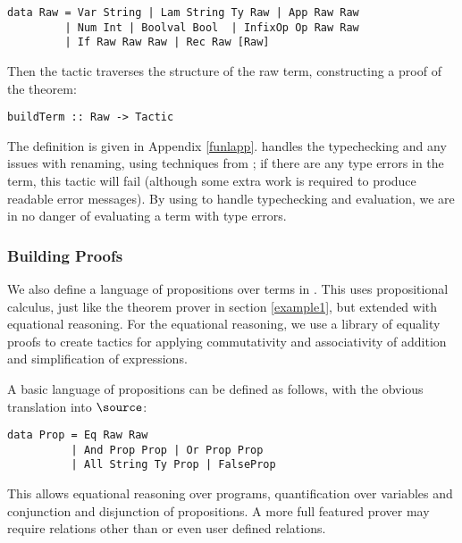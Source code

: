 \begin{verbatim}
data Raw = Var String | Lam String Ty Raw | App Raw Raw
         | Num Int | Boolval Bool  | InfixOp Op Raw Raw
         | If Raw Raw Raw | Rec Raw [Raw]
\end{verbatim}

Then the  tactic traverses the
structure of the raw term, constructing a proof of the
theorem:

\begin{verbatim}
buildTerm :: Raw -> Tactic
\end{verbatim}

The definition is given in Appendix \ref{funlapp}.  \Ivor{} handles
the typechecking and any issues with renaming, using techniques from
\cite{not-a-number}; if there are any type errors in the 
term, this tactic will fail (although some extra work is required to
produce readable error messages). By using \Ivor{} to handle
typechecking and evaluation, we are in no danger of evaluating a term
with type errors.


\subsubsection{Building Proofs}

We also define a language of propositions over terms in \Funl{}.
This uses propositional calculus, just like the theorem prover in
section \ref{example1}, but extended with equational reasoning. For
the equational reasoning, we use a library of equality proofs to
create tactics for applying commutativity and associativity of
addition and simplification of expressions.

A basic language of propositions can be defined as follows, with the
obvious translation into $\source$:

\begin{verbatim}
data Prop = Eq Raw Raw
          | And Prop Prop | Or Prop Prop
          | All String Ty Prop | FalseProp
\end{verbatim}

This allows equational reasoning over \Funl{} programs, quantification
over variables and conjunction and disjunction of propositions. A more
full featured prover may require relations other than  or
even user defined relations.